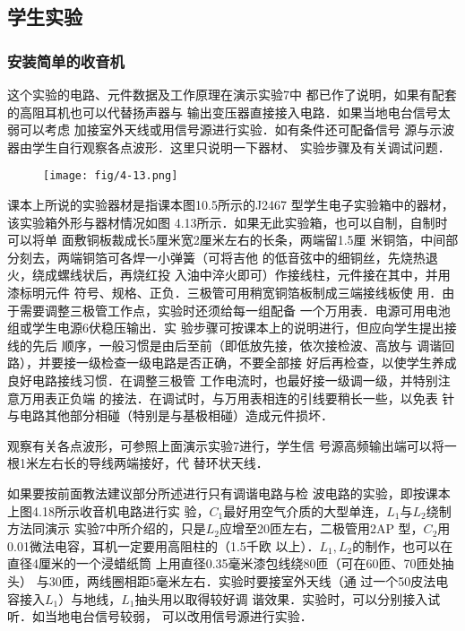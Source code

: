 \subsection{学生实验}
\subsubsection{安装简单的收音机}
这个实验的电路、元件数据及工作原理在演示实验7中
都已作了说明，如果有配套的高阻耳机也可以代替扬声器与
输出变压器直接接入电路．如果当地电台信号太弱可以考虑
加接室外天线或用信号源进行实验．如有条件还可配备信号
源与示波器由学生自行观察各点波形．这里只说明一下器材、
实验步骤及有关调试问题．

\begin{figure}[htp]
    \centering
\texttt{[image: fig/4-13.png]}
    \caption{}
\end{figure}

课本上所说的实验器材是指课本图10.5所示的J2467
型学生电子实验箱中的器材，该实验箱外形与器材情况如图
4.13所示．如果无此实验箱，也可以自制，自制时可以将单
面敷铜板裁成长5厘米宽2厘米左右的长条，两端留1.5厘
米铜箔，中间部分刻去，两端铜箔可各焊一小弹簧（可将吉他
的低音弦中的细铜丝，先烧热退火，绕成螺线状后，再烧红投
入油中淬火即可）作接线柱，元件接在其中，并用漆标明元件
符号、规格、正负．三极管可用稍宽铜箔板制成三端接线板使
用．由于需要调整三极管工作点，实验时还须给每一组配备
一个万用表．电源可用电池组或学生电源6伏稳压输出．实
验步骤可按课本上的说明进行，但应向学生提出接线的先后
顺序，一般习惯是由后至前（即低放先接，依次接检波、高放与
调谐回路），并要接一级检查一级电路是否正确，不要全部接
好后再检查，以使学生养成良好电路接线习惯．在调整三极管
工作电流时，也最好接一级调一级，并特别注意万用表正负端
的接法．在调试时，与万用表相连的引线要稍长一些，以免表
针与电路其他部分相碰（特别是与基极相碰）造成元件损坏．

观察有关各点波形，可参照上面演示实验7进行，学生信
号源高频输出端可以将一根1米左右长的导线两端接好，代
替环状天线．

如果要按前面教法建议部分所述进行只有调谐电路与检
波电路的实验，即按课本上图4.18所示收音机电路进行实
验，$C_1$最好用空气介质的大型单连，$L_1$与$L_2$绕制方法同演示
实验7中所介绍的，只是$L_2$应增至20匝左右，二极管用2AP
型，$C_2$用0.01微法电容，耳机一定要用高阻柱的（1.5千欧
以上）．$L_1,L_2$的制作，也可以在直径4厘米的一个浸蜡纸筒
上用直径0.35毫米漆包线绕80匝（可在60匝、70匝处抽头）
与30匝，两线圈相距5毫米左右．实验时要接室外天线（通
过一个50皮法电容接入$L_1$）与地线，$L_1$抽头用以取得较好调
谐效果．实验时，可以分别接入试听．如当地电台信号较弱，
可以改用信号源进行实验．



